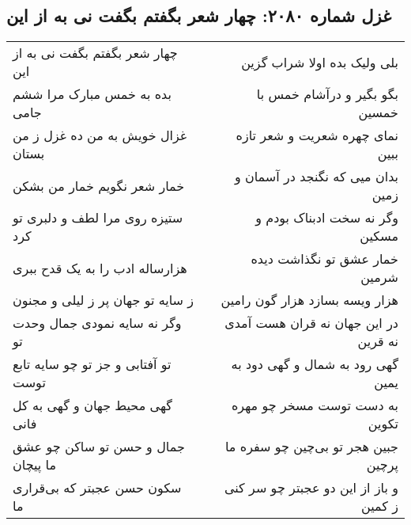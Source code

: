 \begin{center}
\section*{غزل شماره ۲۰۸۰: چهار شعر بگفتم بگفت نی به از این}
\label{sec:2080}
\begin{longtable}{l p{0.5cm} r}
چهار شعر بگفتم بگفت نی به از این
&&
بلی ولیک بده اولا شراب گزین
\\
بده به خمس مبارک مرا ششم جامی
&&
بگو بگیر و درآشام خمس با خمسین
\\
غزال خویش به من ده غزل ز من بستان
&&
نمای چهره شعریت و شعر تازه ببین
\\
خمار شعر نگویم خمار من بشکن
&&
بدان میی که نگنجد در آسمان و زمین
\\
ستیزه روی مرا لطف و دلبری تو کرد
&&
وگر نه سخت ادبناک بودم و مسکین
\\
هزارساله ادب را به یک قدح ببری
&&
خمار عشق تو نگذاشت دیده شرمین
\\
ز سایه تو جهان پر ز لیلی و مجنون
&&
هزار ویسه بسازد هزار گون رامین
\\
وگر نه سایه نمودی جمال وحدت تو
&&
در این جهان نه قران هست آمدی نه قرین
\\
تو آفتابی و جز تو چو سایه تابع توست
&&
گهی رود به شمال و گهی دود به یمین
\\
گهی محیط جهان و گهی به کل فانی
&&
به دست توست مسخر چو مهره تکوین
\\
جمال و حسن تو ساکن چو عشق ما پیچان
&&
جبین هجر تو بی‌چین چو سفره ما پرچین
\\
سکون حسن عجبتر که بی‌قراری ما
&&
و باز از این دو عجبتر چو سر کنی ز کمین
\\
\end{longtable}
\end{center}
